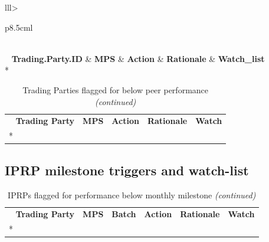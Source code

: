 \documentclass[12pt,table]{article}
\begin{document}
\begingroup\fontsize{10}{12}\selectfont

\begin{longtable}{lll>{\raggedright\arraybackslash}p{8.5cm}l}
\toprule
\endfirsthead
{}\\
\toprule
\endhead
\
\endfoot
\bottomrule
\endlastfoot
{}  \textbf{Trading.Party.ID} & \textbf{MPS} & \textbf{Action} & \textbf{Rationale} & \textbf{Watch\_list}\\

*
\end{longtable}
\endgroup{}

\begingroup\fontsize{10}{12}\selectfont

\begin{longtable}[t]{lll>{\raggedright\arraybackslash}p{8.5cm}l}
\caption{\label{tab:unnamed-chunk-2}Trading Parties flagged for below peer performance}\\
\toprule
\endfirsthead
\caption[]{Trading Parties flagged for below peer performance \textit{(continued)}}\\
\toprule
\endhead
\
\endfoot
\bottomrule
\endlastfoot
\rowcolor{gray!6}  \textbf{Trading Party} & \textbf{MPS} & \textbf{Action} & \textbf{Rationale} & \textbf{Watch}\\

*
\end{longtable}
\endgroup{}

\hypertarget{iprp-milestone-triggers-and-watch-list}{%
\subsection{IPRP milestone triggers and
watch-list}\label{iprp-milestone-triggers-and-watch-list}}

\begingroup\fontsize{10}{12}\selectfont

\begin{longtable}[t]{llll>{\raggedright\arraybackslash}p{7cm}l}
\caption{\label{tab:unnamed-chunk-3}IPRPs flagged for performance below monthly milestone}\\
\toprule
\endfirsthead
\caption[]{IPRPs flagged for performance below monthly milestone \textit{(continued)}}\\
\toprule
\endhead
\
\endfoot
\bottomrule
\endlastfoot
\rowcolor{gray!6}  \textbf{Trading Party} & \textbf{MPS} & \textbf{Batch} & \textbf{Action} & \textbf{Rationale} & \textbf{Watch}\\

*
\end{longtable}
\endgroup{}
\end{document}
